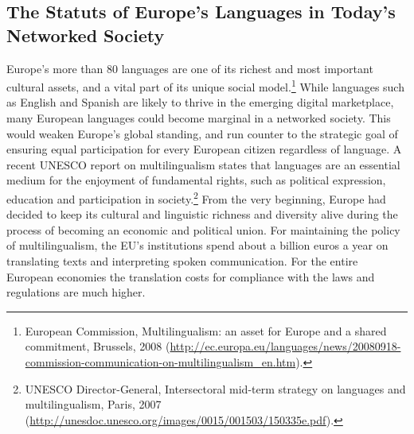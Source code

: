 \documentclass[10pt, plain]{../../metanetpaper}
\begin{document}
\begin{multicols}{2}

\subsection{The Statuts of Europe's Languages in Today's Networked Society}
\label{sec:status-europes-languages}

Europe’s more than 80 languages are one of its richest and most important cultural assets, and a vital part of its unique social model.\footnote{European Commission, Multilingualism: an asset for Europe and a shared commitment, Brussels, 2008 (\url{http://ec.europa.eu/languages/news/20080918-commission-communication-on-multilingualism_en.htm}).}  While languages such as English and Spanish are likely to thrive in the emerging digital marketplace, many European languages could become marginal in a networked society. This would weaken Europe’s global standing, and run counter to the strategic goal of ensuring equal participation for every European citizen regardless of language. A recent UNESCO report on multilingualism states that languages are an essential medium for the enjoyment of fundamental rights, such as political expression, education and participation in society.\footnote{UNESCO Director-General, Intersectoral mid-term strategy on languages and multilingualism, Paris, 2007 (\url{http://unesdoc.unesco.org/images/0015/001503/150335e.pdf}).} From the very beginning, Europe had decided to keep its cultural and linguistic richness and diversity alive during the process of becoming an economic and political union. For maintaining the policy of multilingualism, the EU’s institutions spend about a billion euros a year on translating texts and interpreting spoken communication. For the entire European economies the translation costs for compliance with the laws and regulations are much higher.
 

\end{multicols}
\end{document}
